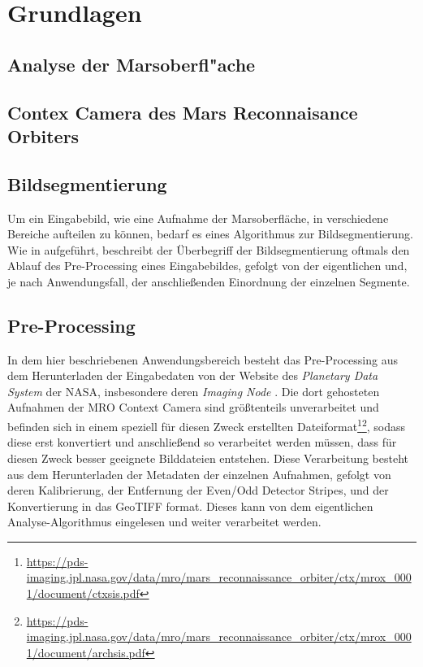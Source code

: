 \chapter{Grundlagen}
\label{chap:grundlagen}

\section{Analyse der Marsoberfl"ache}
\label{sec:analysedermarsoberflache}


\section{Contex Camera des Mars Reconnaisance Orbiters}
\label{sec:mroctx}

\section{Bildsegmentierung}
\label{sec:segmentierung}

Um ein Eingabebild, wie \zB eine Aufnahme der Marsoberfläche, in verschiedene Bereiche aufteilen zu können, bedarf es eines Algorithmus zur Bildsegmentierung. Wie in \cite{bildsegmentierung} aufgeführt, beschreibt der Überbegriff der Bildsegmentierung oftmals den Ablauf des Pre-Processing eines Eingabebildes, gefolgt von der eigentlichen  und, je nach Anwendungsfall, der anschließenden Einordnung der einzelnen Segmente.

\section{Pre-Processing}
\label{sec:preprocessing}

In dem hier beschriebenen Anwendungsbereich besteht das Pre-Processing aus dem Herunterladen der Eingabedaten von der Website des \textit{Planetary Data System} der NASA, insbesondere deren \textit{Imaging Node} \cite{pds}. Die dort gehosteten Aufnahmen der MRO Context Camera sind größtenteils unverarbeitet und befinden sich in einem speziell für diesen Zweck erstellten Dateiformat\footnote{\url{https://pds-imaging.jpl.nasa.gov/data/mro/mars\_reconnaissance\_orbiter/ctx/mrox\_0001/document/ctxsis.pdf}}\footnote{\url{https://pds-imaging.jpl.nasa.gov/data/mro/mars\_reconnaissance\_orbiter/ctx/mrox\_0001/document/archsis.pdf}}, sodass diese erst konvertiert und anschließend so verarbeitet werden müssen, dass für diesen Zweck besser geeignete Bilddateien entstehen.
Diese Verarbeitung besteht aus dem Herunterladen der Metadaten der einzelnen Aufnahmen, gefolgt von deren Kalibrierung, der Entfernung der Even/Odd Detector Stripes, und der Konvertierung in das GeoTIFF format. Dieses kann von dem eigentlichen Analyse-Algorithmus eingelesen und weiter verarbeitet werden.

